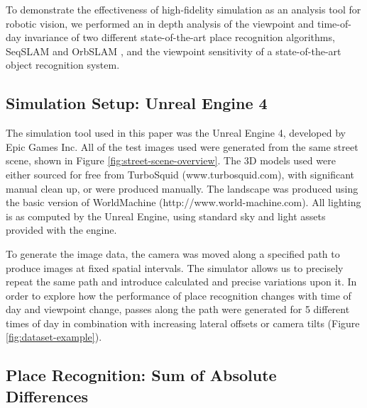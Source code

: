 \documentclass[letterpaper, 10 pt, conference]{ieeeconf}  %
\begin{document}
To demonstrate the effectiveness of high-fidelity simulation as an analysis tool for robotic vision, we performed an in depth analysis of the viewpoint and time-of-day invariance of two different state-of-the-art place recognition algorithms, SeqSLAM \cite{Milford2012} and OrbSLAM \cite{Montiel2015}, and the viewpoint sensitivity of a state-of-the-art object recognition system.

\subsection{Simulation Setup: Unreal Engine 4}

The simulation tool used in this paper was the Unreal Engine 4, developed by Epic Games Inc. All of the test images used were generated from the same street scene, shown in Figure \ref{fig:street-scene-overview}. The 3D models used were either sourced for free from TurboSquid (www.turbosquid.com), with significant manual clean up, or were produced manually. The landscape was produced using the basic version of WorldMachine (http://www.world-machine.com). All lighting is as computed by the Unreal Engine, using standard sky and light assets provided with the engine.

To generate the image data, the camera was moved along a specified path to produce images at fixed spatial intervals.
The simulator allows us to precisely repeat the same path and introduce calculated and precise variations upon it.
In order to explore how the performance of place recognition changes with time of day and viewpoint change, passes along the path were generated for 5 different times of day in combination with increasing lateral offsets or camera tilts (Figure \ref{fig:dataset-example}).


\subsection{Place Recognition: Sum of Absolute Differences}
\end{document}

